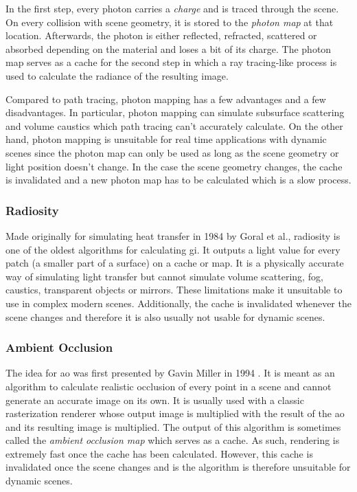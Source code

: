 \documentclass[
  twoside,
  11pt, a4paper,
  footinclude=true,
  headinclude=true,
  cleardoublepage=empty
]{scrreprt}
\begin{document}
In the first step, every photon carries a \emph{charge} and is traced through the scene. On every
collision with scene geometry, it is stored to the \emph{photon map} at that location. Afterwards,
the photon is either reflected, refracted, scattered or absorbed depending on the material and
loses a bit of its charge. The photon map serves as a cache for the second step in which a ray
tracing-like process is used to calculate the radiance of the resulting image.

Compared to path tracing, photon mapping has a few advantages and a few disadvantages. In
particular, photon mapping can simulate subsurface scattering and volume caustics which path
tracing can't accurately calculate. On the other hand, photon mapping is unsuitable for real time
applications with dynamic scenes since the photon map can only be used as long as the scene
geometry or light position doesn't change. In the case the scene geometry changes, the cache is invalidated and a new
photon map has to be calculated which is a slow process.

\subsubsection{Radiosity}
Made originally for simulating heat transfer in 1984 by Goral et al.\cite{article:radiosity},
radiosity is one of the oldest algorithms for calculating \ac{gi}. It outputs a light value for
every patch (a smaller part of a surface) on a cache or map. It is a physically accurate way of
simulating light transfer but cannot simulate volume scattering, fog, caustics, transparent
objects or mirrors. These limitations make it unsuitable to use in complex modern scenes.
Additionally, the cache is invalidated whenever the scene changes and therefore it is also
usually not usable for dynamic scenes.

\subsubsection{Ambient Occlusion}
The idea for \ac{ao} was first presented by Gavin Miller in 1994
\cite{inproceedings:ambient-occlusion}. It is meant as an algorithm to calculate realistic
occlusion of every point in a scene and cannot generate an accurate image on its own. It is
usually used with a classic rasterization renderer whose output image is multiplied with the result
of the \ac{ao} and its resulting image is multiplied. The output of this algorithm is sometimes
called the \emph{ambient occlusion map} which serves as a cache. As such, rendering is extremely
fast once the cache has been calculated. However, this cache is invalidated once the scene changes
and is the algorithm is therefore unsuitable for dynamic scenes.
\end{document}
